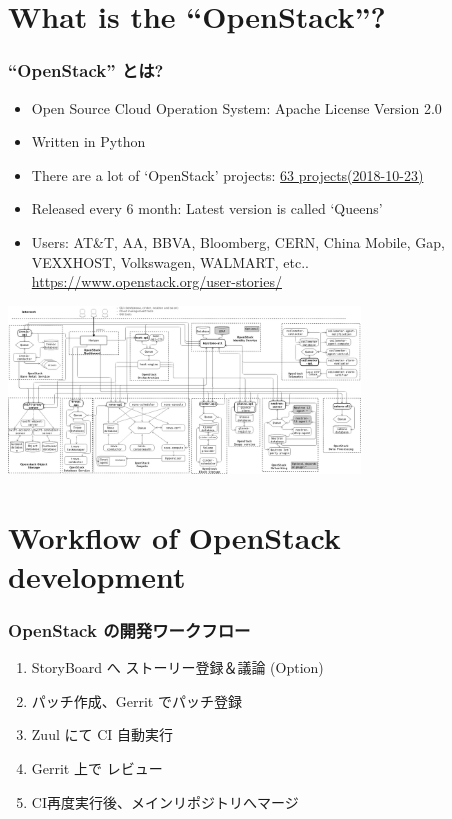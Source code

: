 \documentclass[aspectratio=169,11pt,hyperref={colorlinks=true}]{beamer}
\begin{document}
\section{What is the ``OpenStack''?}
\begin{frame}
  \frametitle{``OpenStack'' とは?}
  \begin{itemize}
    \item Open Source Cloud Operation System: Apache License Version 2.0
    \item Written in Python
    \item There are a lot of `OpenStack' projects: \href{http://governance.openstack.org/reference/projects/index.html}{63 projects(2018-10-23)}
    \item Released every 6 month: Latest version is called `Queens'
    \item Users: \scriptsize{AT\&T, AA, BBVA, Bloomberg, CERN,
      China Mobile, Gap, VEXXHOST,
      Volkswagen, WALMART, etc.. \url{https://www.openstack.org/user-stories/}}
  \end{itemize}
  \begin{center}
    \includegraphics[width=0.7\textwidth]{images/openstack-arch-kilo-logical-v1.png}
  \end{center}
\end{frame}

\section{Workflow of OpenStack development}
\begin{frame}
  \frametitle{OpenStack の開発ワークフロー}
  \begin{enumerate}
    \item StoryBoard へ ストーリー登録＆議論 (Option)
    \item パッチ作成、Gerrit でパッチ登録
    \item Zuul にて CI 自動実行
    \item Gerrit 上で レビュー
    \item CI再度実行後、メインリポジトリへマージ
  \end{enumerate}
\end{frame}
\end{document}
